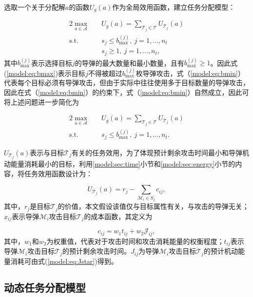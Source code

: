 选取一个关于分配解$a$的函数$U_g(a)$作为全局效用函数，建立任务分配模型：

\begin{alignat}{2}
	\label{model:eq:globalU} \max_{a \in \mathcal{A}} \quad & U_g(a) = \sum_{\mathcal{T}_j \in \mathcal{T}} U_{\mathcal T_j}(a)\\
	\mbox{s.t.} \quad 
	\label{model:eq:bmax} & s_j \leq b_{\text{max}}^{(j)},\ j=1,\dots,n_t\\
	\label{model:eq:bmin}& s_j \geq 1,\ j=1,\dots,n_t,
\end{alignat}
其中$b_{\text{max}}^{(j)}$表示选择目标$j$的导弹的最大数量和最小数量，且有$b_{\text{max}}^{(j)} \geq 1$。因此式(\ref{model:eq:bmax})表示目标$j$不得被超过$b_{\text{max}}^{(j)}$枚导弹攻击，式（\ref{model:eq:bmin}）代表每个目标必须有导弹攻击，但由于实际中往往使用多于目标数量的导弹攻击，因此在式（\ref{model:eq:bmin}）的约束下，式（\ref{model:eq:bmin}）自然成立，因此可将上述问题进一步简化为

\begin{alignat}{2}
	\label{model:eq:simUg} \max_{a \in \mathcal{A}} \quad & U_g(a) = \sum_{\mathcal{T}_j \in \mathcal{T}} U_{\mathcal T_j}(a)\\
	\mbox{s.t.} \quad 
	\label{model:eq:simbmax} & s_j \leq b_{\text{max}}^{(j)},\ j=1,\dots,n_t.
\end{alignat}

$U_{\mathcal T_j}(a)$表示与目标$\mathcal{T}_j$有关的任务效用，为了体现预计剩余攻击时间最小和导弹机动能量消耗最小的目标，利用\ref{model:sec:time}小节和\ref{model:sec:energy}小节的内容，将任务效用函数设计为：

\begin{equation}
\label{model:eq:taskU}
	U_{\mathcal{T}_j}(a) = r_j - \sum_{\mathcal{M}_i \in S_j} c_{ij},
\end{equation}
其中，$r_j$是目标$\mathcal{T}_j$的价值，本文假设该值仅与目标属性有关，与攻击的导弹无关；$x_{ij}$表示导弹$\mathcal{M}_i$攻击目标$\mathcal{T}_j$的成本函数，其定义为

\begin{equation}
\label{model:eq:cost}
	c_{ij} = w_1 t_{ij} + w_2 \mathcal{J}_{ij},
\end{equation}
其中，$w_1$和$w_2$为权重值，代表对于攻击时间和攻击消耗能量的权衡程度；$t_{ij}$表示导弹$\mathcal{M}_i$攻击目标$\mathcal{T}_j$的预计剩余攻击时间。$J_{ij}$为导弹$\mathcal{M}_i$攻击目标$\mathcal{T}_j$的预计机动能量消耗可由式(\ref{model:eq:Jstar})得到。

\subsection{动态任务分配模型}
\label{model:dynamic_model}

